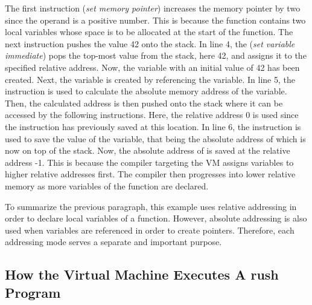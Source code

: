 
The first instruction  (\emph{set memory pointer}) increases the memory pointer by two since the operand is a positive number.
This is because the  function contains two local variables whose space is to be allocated at the start of the function.
The next instruction  pushes the value 42 onto the stack.
In line 4, the  (\emph{set variable immediate}) pops the top-most value from the stack, here 42, and assigns it to the specified relative address.
Now, the variable  with an initial value of 42 has been created.
Next, the  variable is created by referencing the  variable.
In line 5, the  instruction is used to calculate the absolute memory address of the  variable.
Then, the calculated address is then pushed onto the stack where it can be accessed by the following instructions.
Here, the relative address 0 is used since the  instruction has previously saved  at this location.
In line 6, the  instruction is used to save the value of the  variable,
that being the absolute address of  which is now on top of the stack.
Now, the absolute address of  is saved at the relative address -1.
This is because the compiler targeting the VM assigns variables to higher relative addresses first.
The compiler then progresses into lower relative memory as more variables of the function are declared.

To summarize the previous paragraph, this example uses relative addressing in order to declare local variables of a function.
However, absolute addressing is also used when variables are referenced in order to create pointers.
Therefore, each addressing mode serves a separate and important purpose.

\subsection{How the Virtual Machine Executes A rush Program}

